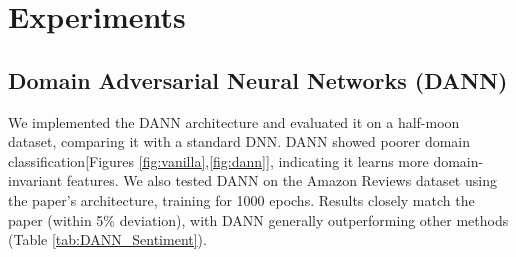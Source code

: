 \documentclass{article}
\begin{document}
\section{Experiments}


\subsection{Domain Adversarial Neural Networks (DANN)}
We implemented the DANN architecture and evaluated it on a half-moon dataset, comparing it with a standard DNN. DANN showed poorer domain classification[Figures \ref{fig:vanilla},\ref{fig:dann}], indicating it learns more domain-invariant features.
We also tested DANN on the Amazon Reviews dataset using the paper’s architecture, training for 1000 epochs. Results closely match the paper (within 5\% deviation), with DANN generally outperforming other methods (Table \ref{tab:DANN_Sentiment}).
\end{document}
